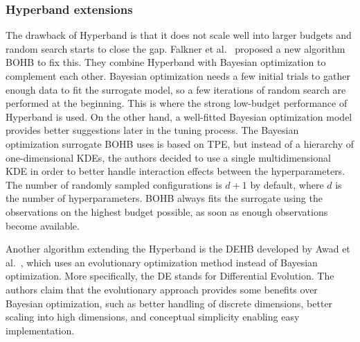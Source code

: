 \subsubsection{Hyperband extensions}
The drawback of Hyperband is that it does not scale well into larger budgets and random search starts to close the gap. Falkner et al.~\cite{falkner2018bohb} proposed a new algorithm BOHB to fix this. They combine Hyperband with Bayesian optimization to complement each other. Bayesian optimization needs a few initial trials to gather enough data to fit the surrogate model, so a few iterations of random search are performed at the beginning. This is where the strong low-budget performance of Hyperband is used. On the other hand, a well-fitted Bayesian optimization model provides better suggestions later in the tuning process. The Bayesian optimization surrogate BOHB uses is based on TPE, but instead of a hierarchy of one-dimensional KDEs, the authors decided to use a single multidimensional KDE in order to better handle interaction effects between the hyperparameters. The number of randomly sampled configurations is $d+1$ by default, where $d$ is the number of hyperparameters. BOHB always fits the surrogate using the observations on the highest budget possible, as soon as enough observations become available.


Another algorithm extending the Hyperband is the DEHB developed by Awad et al.~\cite{awad2021dehb}, which uses an evolutionary optimization method instead of Bayesian optimization. More specifically, the DE stands for Differential Evolution. The authors claim that the evolutionary approach provides some benefits over Bayesian optimization, such as better handling of discrete dimensions, better scaling into high dimensions, and conceptual simplicity enabling easy implementation.

